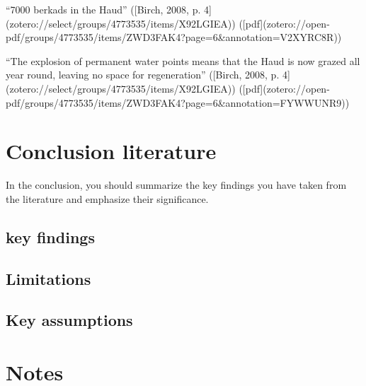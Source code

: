 {{“7000 berkads in the Haud” ([Birch, 2008, p. 4](zotero://select/groups/4773535/items/X92LGIEA)) ([pdf](zotero://open-pdf/groups/4773535/items/ZWD3FAK4?page=6&annotation=V2XYRC8R))

“The explosion of permanent water points means that the Haud is now grazed all year round, leaving no space for regeneration” ([Birch, 2008, p. 4](zotero://select/groups/4773535/items/X92LGIEA)) ([pdf](zotero://open-pdf/groups/4773535/items/ZWD3FAK4?page=6&annotation=FYWWUNR9))


\section{Conclusion literature}
In the conclusion, you should summarize the key findings you have taken from the literature and emphasize their significance.

\subsection{key findings}


\subsection{Limitations}



\subsection{Key assumptions}





\section{Notes}

}}
